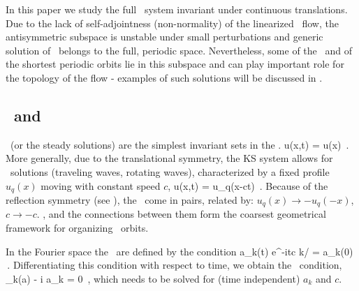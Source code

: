 In this paper we study the full \KS\ system invariant
under continuous translations. Due to the lack of self-adjointness
(non-normality) of the linearized \KS\ flow,
the antisymmetric subspace
is unstable under small perturbations and generic solution of
\KSe\ belongs to the full, periodic space. Nevertheless, some of
the \eqva\ and of the shortest periodic orbits lie in this subspace
and can play important role for the topology of the flow - examples
of such solutions will be discussed in .

\subsection{\Eqva\ and \reqva} %
\label{sec:stks}


\Eqva\  (or the steady solutions)
are the simplest invariant sets in
the \statesp. 
\beq
 u(x,t) = u(x) %
\,.
More generally, due to the translational symmetry,
the KS system allows for \reqv\ solutions
(traveling waves, rotating waves),
characterized by a fixed profile $u_q(x)$
moving with constant speed $c$, {\ie}
\beq
 u(x,t) =  u_q(x-ct) %
\,.
Because of the reflection symmetry (see ),
the \reqva\ come in pairs,
related by: $u_q(x) \to -u_q(-x)$, $c \to -c$.
\Eqva,  and
the connections between them form the
coarsest geometrical framework for organizing
\statesp\ orbits. %

In the Fourier space the \reqva\ are defined by the condition
\beq
 a_k(t) e^{-itc k/\tildeL} = a_k(0)
\,.
Differentiating this condition with respect to time, we obtain
the \reqv\ condition,
\beq
 \pVeloc_k(a) - i  a_k = 0
\,,
which needs to be solved for (time independent) $a_k$ and $c$.

